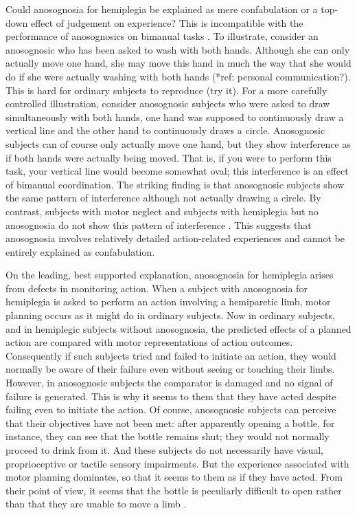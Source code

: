 \documentclass[12pt,\papersize]{extarticle}
\begin{document}
Could anosognosia for hemiplegia be explained as mere confabulation or a top-down effect of judgement on experience?  This is incompatible with the performance of anosognosics on bimanual tasks \citep{berti:2008_motor, garbarini:2012_moving}.  To illustrate, consider an anosognosic who has been asked to wash with both hands.  Although she can only actually move one hand, she may move this hand in much the way that she would do if she were actually washing with both hands (*ref: personal communication?).  This is hard for ordinary subjects to reproduce (try it). For a more carefully controlled illustration, consider anosognosic subjects who were asked to draw simultaneously with both hands, one hand was supposed to continuously draw a vertical line and the other hand to continuously draws a circle.  Anosognosic subjects can of course only actually move one hand, but they show interference as if both hands were actually being moved.  That is, if you were to perform this task, your vertical line would become somewhat oval; this interference is an effect of bimanual coordination.  The striking finding is that anosognosic subjects show the same pattern of interference although not actually drawing a circle.  By contrast, subjects with motor neglect and subjects with hemiplegia but no anosognosia do not show this pattern of interference \citep{garbarini:2012_moving}.  This suggests that anosognosia involves relatively detailed action-related experiences and cannot be entirely explained as confabulation.  

On the leading, best supported explanation, anosognosia for hemiplegia arises from defects in monitoring action.  When a subject with anosognosia for hemiplegia is asked to perform an action involving a hemiparetic limb, motor planning occurs as it might do in ordinary subjects. Now in ordinary subjects, and in hemiplegic subjects without anosognosia, the predicted effects of a planned action are compared with motor representations of action outcomes.  Consequently if such subjects tried and failed to initiate an action, they would normally be aware of their failure even without seeing or touching their limbs. However, in anosognosic subjects the comparator is damaged and no signal of failure is generated.  This is why it seems to them that they have acted despite failing even to initiate the action.  Of course, anosognosic subjects can perceive that their objectives have not been met: after apparently opening a bottle, for instance, they can see that the bottle remains shut; they would not normally proceed to drink from it.  And these subjects do not necessarily have visual, proprioceptive or tactile sensory impairments.  But the experience associated with motor planning dominates, so that it seems to them as if they have acted.  From their point of view, it seems that the bottle is peculiarly difficult to open rather than that they are unable to move a limb \citep[pp.\ 173-4]{berti:2008_motor}.  
\end{document}
